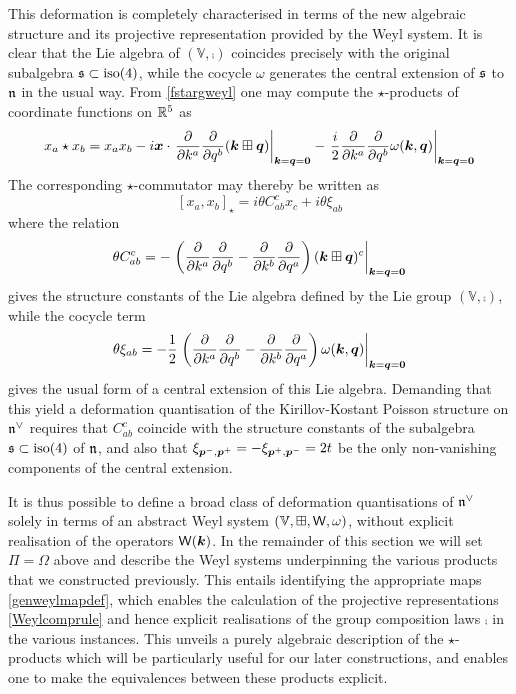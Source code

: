 This deformation is completely characterised in terms of the new algebraic
structure and its projective representation provided by the Weyl system. It is
clear that the Lie algebra of $(\mathbb{V},\comp)$ coincides precisely with the
original subalgebra ${\mathfrak s}\subset{\rm iso}(4)$, while the cocycle $\omega$
generates the central extension of ${\mathfrak s}$ to ${\mathfrak n}$ in the usual way. From
\eqref{fstargweyl} one may compute the $\star$-products of coordinate functions
on ${\mathbb R}^5$ as
\begin{equation}
  \label{xastarxbweyl}
  x_a\star x_b=x_a x_b- i{{\boldsymbol {x} }}\cdot\left.\frac{\partial}{\partial k^a}\frac{\partial}
    {\partial q^b}({{\boldsymbol {k} }}\boxplus{{\boldsymbol {q} }})\right|_{{{\boldsymbol {k} }}={{\boldsymbol {q} }}={\boldsymbol {0} }}-\left.\frac i2 
    \frac{\partial}{\partial k^a}\frac{\partial}
    {\partial q^b}\omega({{\boldsymbol {k} }},{{\boldsymbol {q} }})\right|_{{{\boldsymbol {k} }}={{\boldsymbol {q} }}={\boldsymbol {0} }}
\end{equation}
The corresponding $\star$-commutator may thereby be written as
\begin{equation}
  \label{xaxbstarcommxi}
  [x_a,x_b]_\star= i\theta C_{ab}^{  c} x_c+ i\theta \xi_{ab}
\end{equation}
where the relation
\begin{equation}
  \label{Cabccomp}
  \theta C_{ab}^{  c}=-\left.\left(\frac{\partial}{\partial k^a}\frac{\partial}
      {\partial q^b}-\frac{\partial}{\partial k^b}\frac{\partial}
      {\partial q^a}\right)({{\boldsymbol {k} }}\boxplus{{\boldsymbol {q} }})^c\right|_{{{\boldsymbol {k} }}={{\boldsymbol {q} }}={\boldsymbol {0} }}
\end{equation}
gives the structure constants of the Lie algebra defined by the Lie group
$(\mathbb{V},\comp)$, while the cocycle term
\begin{equation}
  \label{cocycleterm}
  \theta \xi_{ab}=-\frac12 \left.\left(\frac{\partial}{\partial k^a}\frac{\partial}
      {\partial q^b}-\frac{\partial}{\partial k^b}\frac{\partial}
      {\partial q^a}\right)\omega({{\boldsymbol {k} }},{{\boldsymbol {q} }})\right|_{{{\boldsymbol {k} }}={{\boldsymbol {q} }}={\boldsymbol {0} }}
\end{equation}
gives the usual form of a central extension of this Lie algebra. Demanding that
this yield a deformation quantisation of the Kirillov-Kostant Poisson structure
on ${\mathfrak n}^\vee$ requires that $C_{ab}^{ c}$ coincide with the structure constants of
the subalgebra ${\mathfrak s}\subset{\rm iso}(4)$ of ${\mathfrak n}$, and also that $\xi_{{{\boldsymbol {p} }}^-,
  {{\boldsymbol {p} }}^+} = -\xi_{{{\boldsymbol {p} }}^+,{{\boldsymbol {p} }}^-}=2t$ be the only non-vanishing components of the
central extension.

It is thus possible to define a broad class of deformation quantisations of
${\mathfrak n}^\vee$ solely in terms of an abstract Weyl system
$({\mathbb V},\boxplus,\operatorname{{\sf W}},\omega)$, without explicit realisation of the operators
$\operatorname{{\sf W}}({{\boldsymbol {k} }})$. In the remainder of this section we will set $\Pi=\Omega$ above
and describe the Weyl systems underpinning the various products that we
constructed previously. This entails identifying the appropriate maps
\eqref{genweylmapdef}, which enables the calculation of the projective
representations \eqref{Weylcomprule} and hence explicit realisations of the
group composition laws $\comp$ in the various instances. This unveils a purely
algebraic description of the $\star$-products which will be particularly useful
for our later constructions, and enables one to make the equivalences between
these products explicit.

